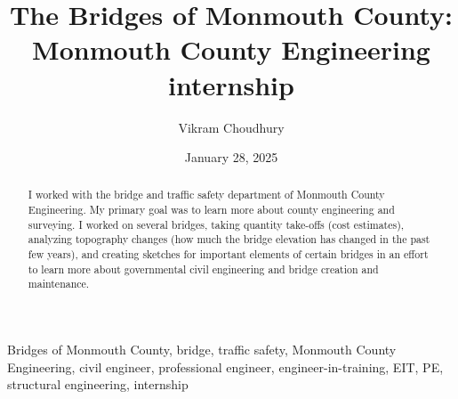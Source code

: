 ﻿\documentclass[12pt,conference,onecolumn]{IEEEtran}
\title{The Bridges of Monmouth County: Monmouth County Engineering internship}
\author{Vikram Choudhury}
\date{January 28, 2025}
\begin{document}
\maketitle 

\begin{abstract}
I worked with the bridge and traffic safety department of Monmouth County Engineering. My primary goal was to learn more about county engineering and surveying. I worked on several bridges, taking quantity take-offs (cost estimates), analyzing topography changes (how much the bridge elevation has changed in the past few years), and creating sketches for important elements of certain bridges in an effort to learn more about governmental civil engineering and bridge creation and maintenance.
\end{abstract}

\begin{IEEEkeywords}
Bridges of Monmouth County, bridge, traffic safety, Monmouth County Engineering, civil engineer, professional engineer, engineer-in-training, EIT, PE, structural engineering, internship
\end{IEEEkeywords}
\end{document}
